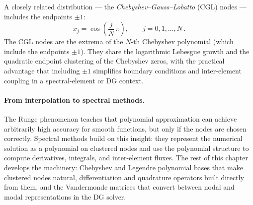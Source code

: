 A closely related distribution --- the \emph{Chebyshev--Gauss--Lobatto}
(CGL) nodes --- includes the endpoints $\pm 1$:
%
\begin{equation}
  x_j = \cos\!\left(\frac{j}{N}\,\pi\right) ,
  \qquad j = 0, 1, \ldots, N \,.
  \label{eq:cgl-nodes}
\end{equation}
%
The CGL nodes are the extrema of the $N$-th Chebyshev polynomial
(which include the endpoints $\pm 1$).  They share the logarithmic Lebesgue
growth and the quadratic endpoint clustering of the Chebyshev zeros,
with the practical advantage that including $\pm 1$ simplifies
boundary conditions and inter-element coupling in a spectral-element
or DG context.

\paragraph{From interpolation to spectral methods.}

The Runge phenomenon teaches that polynomial approximation can
achieve arbitrarily high accuracy for smooth functions, but only if
the nodes are chosen correctly.  Spectral methods build on this
insight: they represent the numerical solution as a polynomial on
clustered nodes and use the polynomial structure to compute
derivatives, integrals, and inter-element fluxes.  The rest of this
chapter develops the machinery: Chebyshev and Legendre polynomial
bases that make clustered nodes natural, differentiation and
quadrature operators built directly from them, and the Vandermonde
matrices that convert between nodal and modal representations in the
DG solver.
